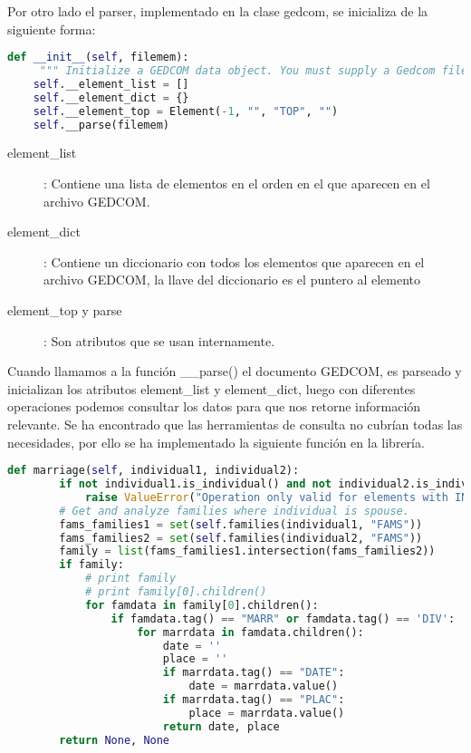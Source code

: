 Por otro lado el parser, implementado en la clase gedcom, se inicializa de la siguiente forma:
\begin{lstlisting}[language=python]
def __init__(self, filemem):
     """ Initialize a GEDCOM data object. You must supply a Gedcom file."""
    self.__element_list = []
    self.__element_dict = {}
    self.__element_top = Element(-1, "", "TOP", "")
    self.__parse(filemem)
\end{lstlisting}

\begin{description}
\item[element\_list]: Contiene una lista de elementos en el orden en el que aparecen en el archivo GEDCOM.
\item[element\_dict]: Contiene un diccionario con todos los elementos que aparecen en el archivo GEDCOM, la llave del diccionario es el puntero al elemento
\item[element\_top y parse]: Son atributos que se usan internamente.
\end{description}

Cuando llamamos a la función \_\_parse() el documento GEDCOM, es parseado y inicializan los atributos element\_list y element\_dict, luego con diferentes operaciones podemos consultar los datos para que nos retorne información relevante. Se ha encontrado que las herramientas de consulta no cubrían todas las necesidades, por ello se ha implementado la siguiente función en la librería.
\newpage
\begin{lstlisting}[language=python]
    def marriage(self, individual1, individual2):
        if not individual1.is_individual() and not individual2.is_individual():
            raise ValueError("Operation only valid for elements with INDI tag")
        # Get and analyze families where individual is spouse.
        fams_families1 = set(self.families(individual1, "FAMS"))
        fams_families2 = set(self.families(individual2, "FAMS"))
        family = list(fams_families1.intersection(fams_families2))
        if family:
            # print family
            # print family[0].children()
            for famdata in family[0].children():
                if famdata.tag() == "MARR" or famdata.tag() == 'DIV':
                    for marrdata in famdata.children():
                        date = ''
                        place = ''
                        if marrdata.tag() == "DATE":
                            date = marrdata.value()
                        if marrdata.tag() == "PLAC":
                            place = marrdata.value()
                        return date, place
        return None, None
\end{lstlisting}

